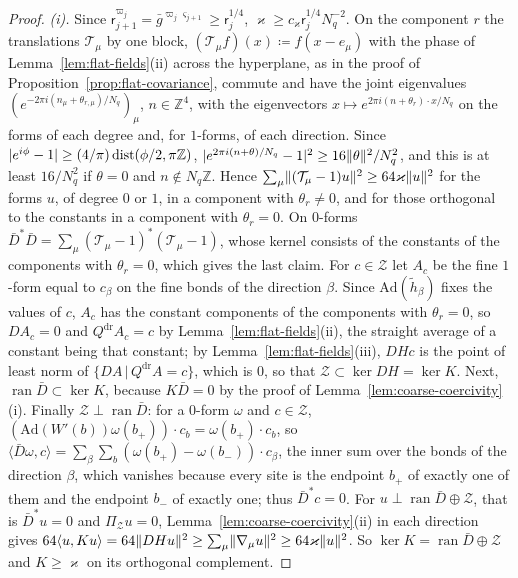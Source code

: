 \documentclass[11pt]{preprint}
\DeclarePairedDelimiter{\abs}{\lvert}{\rvert}
\DeclarePairedDelimiter{\norm}{\lVert}{\rVert}
\numberwithin{equation}{section}
\theoremstyle{definition}
\theoremstyle{remark}
\theoremstyle{plain}
\begin{document}
\begin{proof}
\emph{(i).} Since $\mathsf r_{j+1}^{\varpi_j} = \bar g^{\varpi_j\varsigma_{j+1}} \geq \mathsf r_j^{1/4}$, $\varkappa \geq c_\varkappa\mathsf r_j^{1/4}N_q^{-2}$. On the component $r$ the translations $\mathcal T_\mu$ by one block, $(\mathcal T_\mu f)(x) \coloneqq f(x - e_\mu)$ with the phase of Lemma~\ref{lem:flat-fields}(ii) across the hyperplane, as in the proof of Proposition~\ref{prop:flat-covariance}, commute and have the joint eigenvalues $(e^{-2\pi i(n_\mu+\theta_{r,\mu})/N_q})_\mu$, $n \in \mathbb Z^4$, with the eigenvectors $x \mapsto e^{2\pi i(n+\theta_r) \cdot x/N_q}$ on the forms of each degree and, for $1$-forms, of each direction. Since $\abs{e^{i\phi} - 1} \geq (4/\pi)\operatorname{dist}(\phi/2, \pi\mathbb Z)$, $\abs{e^{2\pi i(n+\theta)/N_q} - 1}^2 \geq 16\norm\theta^2/N_q^2$, and this is at least $16/N_q^2$ if $\theta = 0$ and $n \notin N_q\mathbb Z$. Hence $\sum_\mu\norm{(\mathcal T_\mu - 1)u}^2 \geq 64\varkappa\norm u^2$ for the forms $u$, of degree $0$ or $1$, in a component with $\theta_r \neq 0$, and for those orthogonal to the constants in a component with $\theta_r = 0$. On $0$-forms $\bar D^*\bar D = \sum_\mu(\mathcal T_\mu - 1)^*(\mathcal T_\mu - 1)$, whose kernel consists of the constants of the components with $\theta_r = 0$, which gives the last claim. For $c \in \mathcal Z$ let $A_c$ be the fine $1$-form equal to $c_\beta$ on the fine bonds of the direction $\beta$. Since $\mathrm{Ad}(\tilde h_\beta)$ fixes the values of $c$, $A_c$ has the constant components of the components with $\theta_r = 0$, so $DA_c = 0$ and $Q^{\mathrm{dr}}A_c = c$ by Lemma~\ref{lem:flat-fields}(ii), the straight average of a constant being that constant; by Lemma~\ref{lem:flat-fields}(iii), $DHc$ is the point of least norm of $\{ DA \,|\, Q^{\mathrm{dr}}A = c \}$, which is $0$, so that $\mathcal Z \subset \ker DH = \ker K$. Next, $\operatorname{ran}\bar D \subset \ker K$, because $K\bar D = 0$ by the proof of Lemma~\ref{lem:coarse-coercivity}(i). Finally $\mathcal Z \perp \operatorname{ran}\bar D$: for a $0$-form $\omega$ and $c \in \mathcal Z$, $(\mathrm{Ad}(W'(b))\omega(b_+)) \cdot c_b = \omega(b_+) \cdot c_b$, so $\langle\bar D\omega, c\rangle = \sum_\beta\sum_b(\omega(b_+) - \omega(b_-)) \cdot c_\beta$, the inner sum over the bonds of the direction $\beta$, which vanishes because every site is the endpoint $b_+$ of exactly one of them and the endpoint $b_-$ of exactly one; thus $\bar D^*c = 0$. For $u \perp \operatorname{ran}\bar D \oplus \mathcal Z$, that is $\bar D^*u = 0$ and $\Pi_{\mathcal Z}u = 0$, Lemma~\ref{lem:coarse-coercivity}(ii) in each direction gives $64\langle u, Ku\rangle = 64\norm{DHu}^2 \geq \sum_\mu\norm{\nabla_\mu u}^2 \geq 64\varkappa\norm u^2$. So $\ker K = \operatorname{ran}\bar D \oplus \mathcal Z$ and $K \geq \varkappa$ on its orthogonal complement.


\end{proof}
\end{document}
